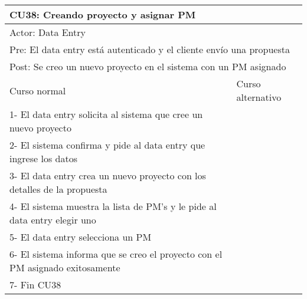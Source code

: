 \begin{table}[H]
  \begin{adjustbox}{max width = \textwidth}
  \begin{tabular}{|l|l|}
    \hline
    \multicolumn{2}{|l|}{CU38: Creando proyecto y asignar PM} \\\hline
    \multicolumn{2}{|l|}{Actor: Data Entry} \\\hline
    \multicolumn{2}{|l|}{Pre: El data entry está autenticado y el cliente envío una propuesta} \\\hline
    \multicolumn{2}{|l|}{Post: Se creo un nuevo proyecto en el sistema con un PM asignado} \\\hline
     Curso normal & Curso alternativo\\ \hline
	 1- El data entry solicita al sistema que cree un nuevo proyecto & \\ \hline
     2- El sistema confirma y pide al data entry que ingrese los datos & \\ \hline
	 3- El data entry crea un nuevo proyecto con los detalles de la propuesta & \\ \hline
	 4- El sistema muestra la lista de PM's y le pide al data entry elegir uno & \\ \hline
     5- El data entry selecciona un PM & \\ \hline
	 6- El sistema informa que se creo el proyecto con el PM asignado exitosamente & \\ \hline
     7- Fin CU38 & \\ \hline
  \end{tabular}
  \end{adjustbox}
\end{table}



